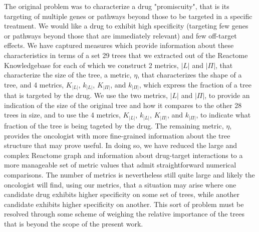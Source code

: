 \documentclass{article}
\begin{document}
The original problem was to characterize a drug "promiscuity", that is its targeting of multiple genes or pathways beyond those to be targeted in a specific treatment. We would like a drug to exhibit high specificity (targeting few genes or pathways beyond those that are immediately relevant) and few off-target effects. We have captured measures which provide information about these characteristics in terms of a set 29 trees that we extracted out of the Reactome Knowledgebase for each of which we construct 2 metrics, $|L|$ and $|\Pi|$, that characterize the size of the tree, a metric, $\eta$, that characterizes the shape of a tree, and 4 metrics, $K_{|L|}$, $k_{|L|}$, $K_{|\Pi|}$, and $k_{|\Pi|}$, which express the fraction of a tree that is targeted by the drug. We use the two metrics, $|L|$ and $|\Pi|$, to provide an indication of the size of the original tree and how it compares to the other 28 trees in size, and to use the 4 metrics, $K_{|L|}$, $k_{|L|}$, $K_{|\Pi|}$, and $k_{|\Pi|}$, to indicate what fraction of the tree is being tageted by the drug. The remaining metric, $\eta$, provides the oncologist with more fine-grained information about the tree structure that may prove useful. In doing so, we have reduced the large and complex Reactome graph and information about drug-target interactions to a more manageable set of metric values that admit straightforward numerical comparisons. The number of metrics is nevertheless still quite large and likely the oncologist will find, using our metrics, that a situation may arise where one candidate drug exhibits higher specificity on some set of trees, while another candidate exhibits higher specificity on another. This sort of problem must be resolved through some scheme of weighing the relative importance of the trees that is beyond the scope of the present work.

\printbibliography

\pagebreak
	
\end{document}
